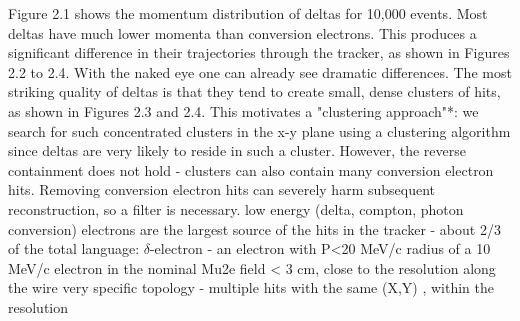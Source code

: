 Figure 2.1 shows the momentum distribution of deltas for 10,000 events.
Most deltas have much lower momenta than conversion electrons. This produces a significant
difference in their trajectories through the tracker, as shown in Figures 2.2 to 2.4. With the naked eye
one can already see dramatic differences.
The most striking quality of deltas is that they tend to create small, dense clusters of hits, as
shown in Figures 2.3 and 2.4. This motivates a "clustering approach"*: we search for such
concentrated clusters in the x-y plane using a clustering algorithm since deltas are very likely to reside
in such a cluster. However, the reverse containment does not hold - clusters can also contain many
conversion electron hits. Removing conversion electron hits can severely harm subsequent
reconstruction, so a filter is necessary. 
low energy (delta, compton, photon conversion) electrons are the largest source of the hits
in the tracker - about 2/3 of the total
language: $\delta$-electron - an electron with P<20 MeV/c
radius of a 10 MeV/c electron in the nominal Mu2e field < 3 cm, close to the resolution
along the wire
very specific topology - multiple hits with the same (X,Y) , within the resolution
\fi